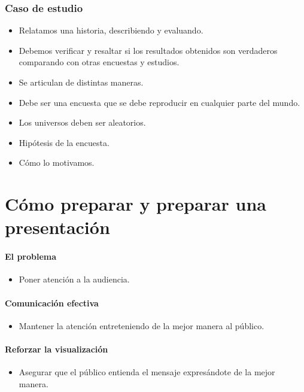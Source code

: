 \subsection{Caso de estudio}

\begin{itemize}
    \item Relatamos una historia, describiendo y evaluando.
    \item Debemos verificar y resaltar si los resultados obtenidos son verdaderos comparando con otras encuestas y estudios.
    \item Se articulan de distintas maneras.
    \item Debe ser una encuesta que se debe reproducir en cualquier parte del mundo.
\end{itemize}


\begin{itemize}
    \item Los universos deben ser aleatorios.
    \item Hipótesis de la encuesta.
    \item Cómo lo motivamos.
\end{itemize}


\chapter{Cómo preparar y preparar una presentación}

\subsubsection{El problema}
\begin{itemize}
    \item Poner atención a la audiencia.
\end{itemize}

\subsubsection{Comunicación efectiva}
\begin{itemize}
    \item Mantener la atención entreteniendo de la mejor manera al público.
\end{itemize}

\subsubsection{Reforzar la visualización}
\begin{itemize}
    \item Asegurar que el público entienda el mensaje expresándote de la mejor manera.
\end{itemize}

